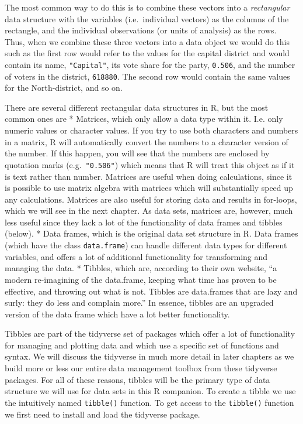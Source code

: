 \documentclass[
]{book}
\begin{document}
The most common way to do this is to combine these vectors into a \emph{rectangular} data structure with the variables (i.e.~individual vectors) as the columns of the rectangle, and the individual observations (or units of analysis) as the rows. Thus, when we combine these three vectors into a data object we would do this such as the first row would refer to the values for the capital district and would contain its name, \texttt{"Capital"}, its vote share for the party, \texttt{0.506}, and the number of voters in the district, \texttt{618880}. The second row would contain the same values for the North-district, and so on.

There are several different rectangular data structures in R, but the most common ones are
* Matrices, which only allow a data type within it. I.e. only numeric values or character values. If you try to use both characters and numbers in a matrix, R will automatically convert the numbers to a character version of the number. If this happen, you will see that the numbers are enclosed by quotation marks (e.g.~\texttt{"0.506"}) which means that R will treat this object as if it is text rather than number. Matrices are useful when doing calculations, since it is possible to use matrix algebra with matrices which will substantially speed up any calculations. Matrices are also useful for storing data and results in for-loops, which we will see in the next chapter. As data sets, matrices are, however, much less useful since they lack a lot of the functionality of data frames and tibbles (below).
* Data frames, which is the original data set structure in R. Data frames (which have the class \texttt{data.frame}) can handle different data types for different variables, and offers a lot of additional functionality for transforming and managing the data.
* Tibbles, which are, according to their own website, ``a modern re-imagining of the data.frame, keeping what time has proven to be effective, and throwing out what is not. Tibbles are data.frames that are lazy and surly: they do less and complain more.'' In essence, tibbles are an upgraded version of the data frame which have a lot better functionality.

Tibbles are part of the tidyverse set of packages which offer a lot of functionality for managing and plotting data and which use a specific set of functions and syntax. We will discuss the tidyverse in much more detail in later chapters as we build more or less our entire data management toolbox from these tidyverse packages. For all of these reasons, tibbles will be the primary type of data structure we will use for data sets in this R companion. To create a tibble we use the intuitively named \texttt{tibble()} function. To get access to the \texttt{tibble()} function we first need to install and load the tidyverse package.
\end{document}
